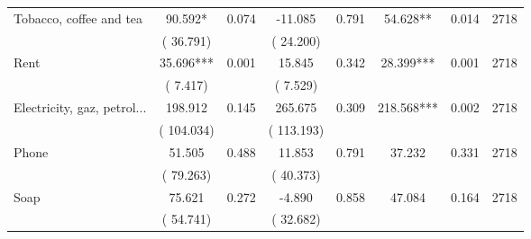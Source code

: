\begin{tabular}{l*{7}{c}}
 Tobacco, coffee and tea       &             90.592*       &        0.074  &            -11.085       &        0.791  &             54.628**       &              0.014 &  2718 \\ 
                       &       (      36.791)             &                               &       (      24.200)                     &                               &                                               &                                &                      \\ 

 Rent       &             35.696***       &        0.001  &             15.845       &        0.342  &             28.399***       &              0.001 &  2718 \\ 
                       &       (       7.417)             &                               &       (       7.529)                     &                               &                                               &                                &                      \\ 

 Electricity, gaz, petrol...       &            198.912       &        0.145  &            265.675       &        0.309  &            218.568***       &              0.002 &  2718 \\ 
                       &       (     104.034)             &                               &       (     113.193)                     &                               &                                               &                                &                      \\ 

 Phone       &             51.505       &        0.488  &             11.853       &        0.791  &             37.232       &              0.331 &  2718 \\ 
                       &       (      79.263)             &                               &       (      40.373)                     &                               &                                               &                                &                      \\ 

 Soap       &             75.621       &        0.272  &             -4.890       &        0.858  &             47.084       &              0.164 &  2718 \\ 
                       &       (      54.741)             &                               &       (      32.682)                     &                               &                                               &                                &                      \\ 


\end{tabular}
